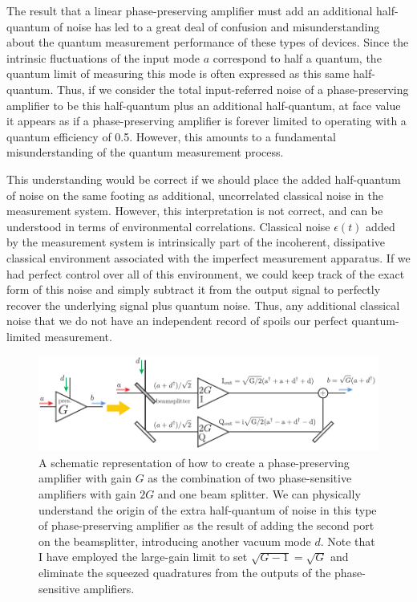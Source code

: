 The result that a linear phase-preserving amplifier must add an additional half-quantum of noise has led to a great deal of confusion and misunderstanding about the quantum measurement performance of these types of devices.  Since the intrinsic fluctuations of the input mode $a$ correspond to half a quantum, the quantum limit of measuring this mode is often expressed as this same half-quantum.  Thus, if we consider the total input-referred noise of a phase-preserving amplifier to be this half-quantum plus an additional half-quantum, at face value it appears as if a phase-preserving amplifier is forever limited to operating with a quantum efficiency of 0.5.  However, this amounts to a fundamental misunderstanding of the quantum measurement process.

This understanding would be correct if we should place the added half-quantum of noise on the same footing as additional, uncorrelated classical noise in the measurement system.  However, this interpretation is not correct, and can be understood in terms of environmental correlations.  Classical noise $\epsilon(t)$ added by the measurement system is intrinsically part of the incoherent, dissipative classical environment associated with the imperfect measurement apparatus.  If we had perfect control over all of this environment, we could keep track of the exact form of this noise and simply subtract it from the output signal to perfectly recover the underlying signal plus quantum noise.  Thus, any additional classical noise that we do not have an independent record of spoils our perfect quantum-limited measurement.

\begin{figure}
\begin{center}
	\includegraphics[width = 6in]{paramps_chapter/pres_from_sens}
\end{center}
\caption[Phase-preserving amplifier as two phase-sensitive amplifiers]{A schematic representation of how to create a phase-preserving amplifier with gain $G$ as the combination of two phase-sensitive amplifiers with gain $2G$ and one beam splitter.  We can physically understand the origin of the extra half-quantum of noise in this type of phase-preserving amplifier as the result of adding the second port on the beamsplitter, introducing another vacuum mode $d$.  Note that I have employed the large-gain limit to set $\sqrt{G-1} = \sqrt{G}$ and eliminate the squeezed quadratures from the outputs of the phase-sensitive amplifiers.}
\label{fig:pres_from_sens}
\end{figure}

